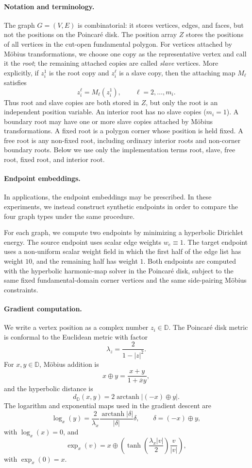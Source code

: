 \documentclass[12pt]{article}
\newcommand{\D}{\mathbb D}
\theoremstyle{definition}
\theoremstyle{remark}
\numberwithin{equation}{section}
\begin{document}
\paragraph{Notation and terminology.}
The graph $G=(V,E)$ is combinatorial: it stores vertices, edges, and faces, but not the positions on the Poincaré disk. The position array $Z$ stores the positions of all vertices in the cut-open fundamental polygon. For vertices attached by Möbius transformations, we choose one copy as the representative vertex and call it the \emph{root}; the remaining attached copies are called \emph{slave} vertices. More explicitly, if $z_i^1$ is the root copy and $z_i^\ell$ is a slave copy, then the attaching map $M_\ell$ satisfies
\[
z_i^\ell = M_\ell(z_i^1), \qquad \ell=2,\ldots,m_i .
\]
Thus root and slave copies are both stored in $Z$, but only the root is an independent position variable. An interior root has no slave copies ($m_i=1$). A boundary root may have one or more slave copies attached by Möbius transformations. A fixed root is a polygon corner whose position is held fixed. A free root is any non-fixed root, including ordinary interior roots and non-corner boundary roots. Below we use only the implementation terms root, slave, free root, fixed root, and interior root.

\paragraph{Endpoint embeddings.}
In applications, the endpoint embeddings may be prescribed. In these experiments, we instead construct synthetic endpoints in order to compare the four graph types under the same procedure.

For each graph, we compute two endpoints by minimizing a hyperbolic Dirichlet energy. The source endpoint uses scalar edge weights $w_e \equiv 1$. The target endpoint uses a non-uniform scalar weight field in which the first half of the edge list has weight $10$, and the remaining half has weight $1$. Both endpoints are computed with the hyperbolic harmonic-map solver in the Poincaré disk, subject to the same fixed fundamental-domain corner vertices and the same side-pairing Möbius constraints.

\paragraph{Gradient computation.}
We write a vertex position as a complex number $z_i \in \D$. The Poincaré disk metric is conformal to the Euclidean metric with factor
\[
\lambda_z = \frac{2}{1-|z|^2}.
\]
For $x,y\in \D$, Möbius addition is
\[
x \oplus y = \frac{x+y}{1+\overline{x}y},
\]
and the hyperbolic distance is
\[
d_{\D}(x,y) = 2 \operatorname{arctanh}\left|(-x)\oplus y\right|.
\]
The logarithm and exponential maps used in the gradient descent are
\[
\log_x(y) = \frac{2}{\lambda_x} \frac{\operatorname{arctanh}|\delta|}{|\delta|} \delta, \qquad \delta=(-x)\oplus y,
\]
with $\log_x(x)=0$, and
\[
\exp_x(v) = x \oplus \left( \tanh\left(\frac{\lambda_x |v|}{2}\right) \frac{v}{|v|} \right),
\]
with $\exp_x(0)=x$.
\end{document}
